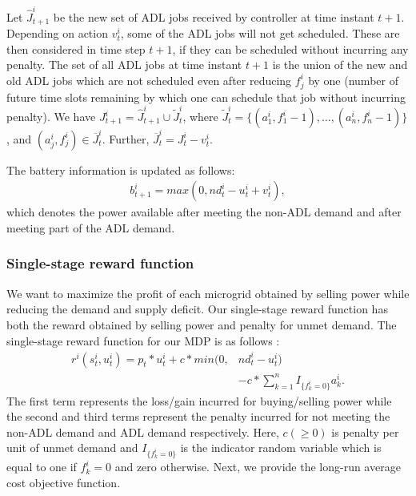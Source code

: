  Let $\widehat J_{t+1}^{i}$ be the new set of ADL jobs received by controller at time instant $t+1$. Depending on action $v_{t}^{i}$, some of the ADL jobs will not get scheduled. These are then considered in time step $t+1$, if they can be scheduled without incurring any penalty. The set of all ADL jobs at time instant $t+1$ is the union of the new and old ADL jobs which are not scheduled even after reducing $f_{j}^{i}$ by one (number of future time slots remaining by which one can schedule that job without incurring penalty).
We have $J_{t+1}^{i} = \widehat J_{t+1}^{i} \cup \widetilde J_{t}^{i}$, where $\widetilde J_{t}^{i} =  \{(a_{1}^{i}, f_{1}^{i} - 1),\ldots,(a_{n}^{i}, f_{n}^{i} - 1)\}$, and $ (a_{j}^{i}, f_{j}^{i}) \in \overline J_{t}^{i}$. Further, $\overline J_{t}^{i} = J_{t}^{i} - v_{t}^{i}$.

The battery information is updated as follows:
\begin{align}
b_{t+1}^{i} = max(0,nd_{t}^{i} - u_{t}^{i} + v_{t}^{i}),
\end{align}
which denotes the power available after meeting the non-ADL demand and after meeting part of the ADL demand.
\subsubsection{Single-stage reward function}
We want to maximize the profit of each microgrid obtained by selling power while reducing the demand and supply deficit. Our single-stage reward function has both the reward obtained by selling power and penalty for unmet demand. The single-stage reward  function for our MDP is as follows :
\begin{align}
r^{i}(s_t^i,u_t^i) = p_{t}*u_{t}^{i} + c*min(0,&nd_{t}^{i} - u_{t}^{i})  \nonumber\\ & - c* \sum_{k =1}^{n} I_{\{f_{k}^{i} = 0\}} a_{k}^{i} .
\end{align}
The first term represents the loss/gain incurred for  buying/selling  power while the second and third terms represent the penalty  incurred for not meeting the non-ADL demand and ADL demand respectively. Here, $c (\ge 0)$ is penalty per unit of unmet demand and $I_{\{f_{k}^{i} = 0\}}$ is the indicator random variable which is equal to one if $f_{k}^{i} =0$ and zero otherwise. 
Next, we provide the long-run average cost objective function. 
